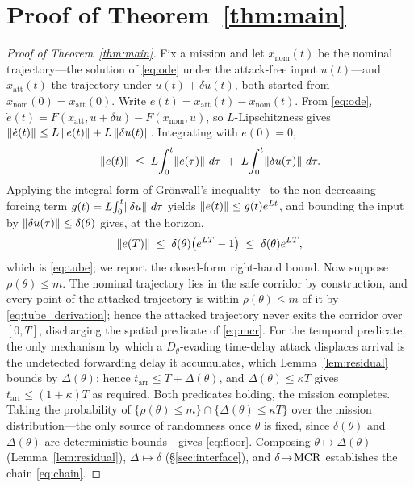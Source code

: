 \section{Proof of Theorem~\ref{thm:main}}
\label{app:proof}
\begin{proof}[Proof of Theorem~\ref{thm:main}]
Fix a mission and let $x_{\mathrm{nom}}(t)$ be the nominal trajectory---the
solution of \eqref{eq:ode} under the attack-free input $u(t)$---and
$x_{\mathrm{att}}(t)$ the trajectory under $u(t)+\delta u(t)$, both started from
$x_{\mathrm{nom}}(0)=x_{\mathrm{att}}(0)$. Write
$e(t)=x_{\mathrm{att}}(t)-x_{\mathrm{nom}}(t)$. From \eqref{eq:ode},
$\dot e(t)=F(x_{\mathrm{att}},u+\delta u)-F(x_{\mathrm{nom}},u)$, so
$L$-Lipschitzness gives
$\left\lVert \dot e(t)\right\rVert\le L\left\lVert e(t)\right\rVert+L\left\lVert \delta u(t)\right\rVert$. Integrating with
$e(0)=0$,
\[
\left\lVert e(t)\right\rVert\;\le\;L\!\int_0^t\!\left\lVert e(\tau)\right\rVert\,d\tau
\;+\;L\!\int_0^t\!\left\lVert \delta u(\tau)\right\rVert\,d\tau .
\]
Applying the integral form of Gr\"onwall's inequality~\cite{gronwall1919} to the
non-decreasing forcing term $g(t)=L\!\int_0^t\!\left\lVert \delta u\right\rVert\,d\tau$ yields
$\left\lVert e(t)\right\rVert\le g(t)e^{Lt}$, and bounding the input by
$\left\lVert \delta u(\tau)\right\rVert\le\delta(\theta)$ gives, at the horizon,
\begin{equation}
\label{eq:tube_derivation}
\left\lVert e(T)\right\rVert\;\le\;\delta(\theta)\big(e^{LT}-1\big)\;\le\;\delta(\theta)e^{LT},
\end{equation}
which is \eqref{eq:tube}; we report the closed-form right-hand bound. Now
suppose $\rho(\theta)\le m$. The nominal trajectory lies in the safe corridor by
construction, and every point of the attacked trajectory is within
$\rho(\theta)\le m$ of it by \eqref{eq:tube_derivation}; hence the attacked
trajectory never exits the corridor over $[0,T]$, discharging the spatial
predicate of \eqref{eq:mcr}. For the temporal predicate, the only mechanism by
which a $D_\theta$-evading time-delay attack displaces arrival is the undetected
forwarding delay it accumulates, which Lemma~\ref{lem:residual} bounds by
$\Delta(\theta)$; hence $t_{\mathrm{arr}}\le T+\Delta(\theta)$, and
$\Delta(\theta)\le\kappa T$ gives $t_{\mathrm{arr}}\le(1+\kappa)T$ as required.
Both predicates holding, the mission completes. Taking the probability of
$\{\rho(\theta)\le m\}\cap\{\Delta(\theta)\le\kappa T\}$ over the mission
distribution---the only source of randomness once $\theta$ is fixed, since
$\delta(\theta)$ and $\Delta(\theta)$ are deterministic bounds---gives
\eqref{eq:floor}. Composing
$\theta\!\mapsto\!\Delta(\theta)$ (Lemma~\ref{lem:residual}),
$\Delta\!\mapsto\!\delta$ (\S\ref{sec:interface}), and $\delta\!\mapsto\!\mathrm{MCR}$
establishes the chain \eqref{eq:chain}.
\end{proof}

